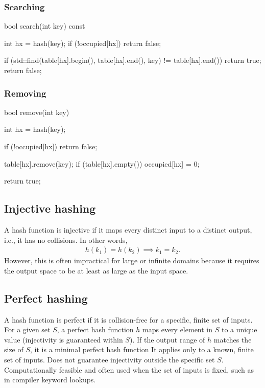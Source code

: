 \documentclass{report}
\begin{document}
\subsubsection{Searching}
\bigbreak \noindent 
\begin{cppcode}
    bool search(int key) const {
        int hx = hash(key);
        if (!occupied[hx]) 
        return false;

        if (std::find(table[hx].begin(), table[hx].end(), key) != table[hx].end()) 
        return true;
        return false;
    }
\end{cppcode}

\bigbreak \noindent 
\subsubsection{Removing}
\bigbreak \noindent 
\begin{cppcode}
    bool remove(int key) {
        int hx = hash(key);

        if (!occupied[hx])
        return false;

        table[hx].remove(key);    
        if (table[hx].empty()) 
        occupied[hx] = 0;

        return true;
    }
\end{cppcode}

\pagebreak 
\subsection{Injective hashing}
\bigbreak \noindent 
A hash function is injective if it maps every distinct input to a distinct output, i.e., it has no collisions. In other words,
\begin{align*}
    h(k_{1}) = h(k_{2}) \implies k_{1} = k_{2}
.\end{align*}
\bigbreak \noindent 
However, this is often impractical for large or infinite domains because it requires the output space to be at least as large as the input space.

\bigbreak \noindent 
\subsection{Perfect hashing}
\bigbreak \noindent 
 A hash function is perfect if it is collision-free for a specific, finite set of inputs. For a given set $S$, a perfect hash function $h$ maps every element in $S$ to a unique value (injectivity is guaranteed within $S$).
 \bigbreak \noindent 
 If the output range of $h$ matches the size of $S$, it is a minimal perfect hash function
 \bigbreak \noindent
 It applies only to a known, finite set of inputs. Does not guarantee injectivity outside the specific set $S$. Computationally feasible and often used when the set of inputs is fixed, such as in compiler keyword lookups.
\end{document}
